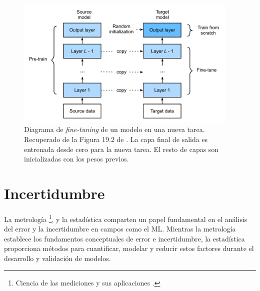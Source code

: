 \begin{figure}[htbp]
    \centering
    \includegraphics[width=0.95\textwidth]{capitulos/cap_02/imagenes/fine-tunning.png}
    \caption[
        Diagrama de \textit{fine-tuning} de un modelo en una nueva tarea. 
        Recuperado de la Figura 19.2 de \cite{murphy2022}.
    ]{
        Diagrama de \textit{fine-tuning} de un modelo en una nueva tarea. 
        Recuperado de la Figura 19.2 de \cite{murphy2022}.
        La capa final de salida es entrenada desde cero para la nueva tarea. El resto de capas son 
        inicializadas con los pesos previos. 
    } 
    \label{fig:fine-tuning}
\end{figure}


\section{Incertidumbre}

La metrología%
\footnote{
    Ciencia de las mediciones y sus aplicaciones \cite{jcgm200:2012}.
},
y la estadística comparten un papel fundamental en el análisis del error y la incertidumbre en campos como 
el \acrshort{ML}. Mientras la metrología establece los fundamentos conceptuales de error e incertidumbre, la estadística proporciona métodos para cuantificar, modelar y reducir estos factores durante el desarrollo y validación de modelos.

